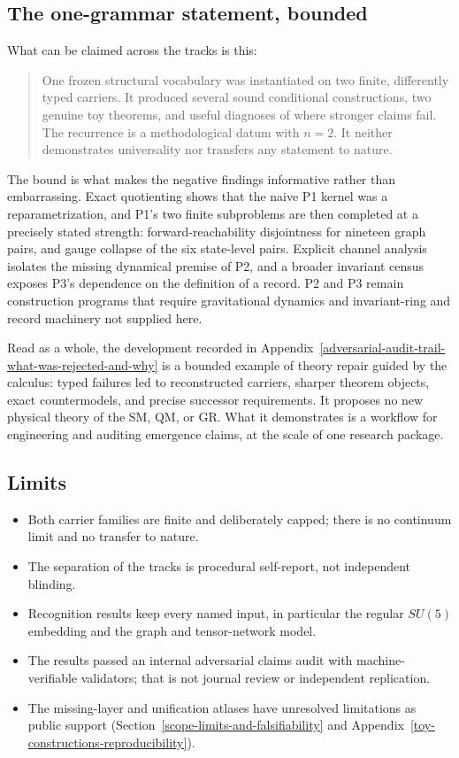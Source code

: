 \subsection{The one-grammar statement, bounded}\label{the-one-grammar-thesis}

What can be claimed across the tracks is this:

\begin{quote}
One frozen structural vocabulary was instantiated on two finite, differently typed carriers. It produced several sound
conditional constructions, two genuine toy theorems, and useful diagnoses of where stronger claims fail. The
recurrence is a methodological datum with \(n=2\). It neither demonstrates universality nor transfers any statement to
nature.
\end{quote}

The bound is what makes the negative findings informative rather than embarrassing. Exact quotienting shows that the
naive P1 kernel was a reparametrization, and P1's two finite subproblems are then completed at a precisely stated
strength: forward-reachability disjointness for nineteen graph pairs, and gauge collapse of the six state-level pairs.
Explicit channel analysis isolates the missing dynamical premise of P2, and a broader invariant census exposes P3's
dependence on the definition of a record. P2 and P3 remain construction programs that require gravitational dynamics
and invariant-ring and record machinery not supplied here.

Read as a whole, the development recorded in Appendix~\ref{adversarial-audit-trail-what-was-rejected-and-why} is a
bounded example of theory repair guided by the calculus: typed failures led to reconstructed carriers, sharper theorem
objects, exact countermodels, and precise successor requirements. It proposes no new physical theory of the SM, QM,
or GR. What it demonstrates is a workflow for engineering and auditing emergence claims, at the scale of one research
package.

\subsection{Limits}\label{the-honest-bound-on-the-thesis}

\begin{itemize}\tightlist
\item Both carrier families are finite and deliberately capped; there is no continuum limit and no transfer to nature.
\item The separation of the tracks is procedural self-report, not independent blinding.
\item Recognition results keep every named input, in particular the regular \(SU(5)\) embedding and the graph and
  tensor-network model.
\item The results passed an internal adversarial claims audit with machine-verifiable validators; that is not journal
  review or independent replication.
\item The missing-layer and unification atlases have unresolved limitations as public support
  (Section~\ref{scope-limits-and-falsifiability} and Appendix~\ref{toy-constructions-reproducibility}).
\end{itemize}
